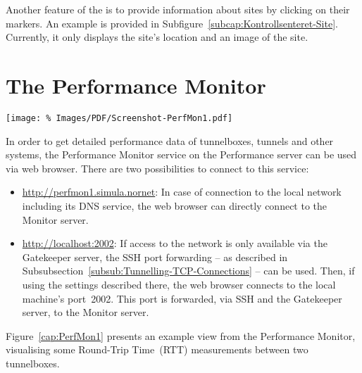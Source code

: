Another feature of the  is to provide information about sites by clicking on their markers. An example is provided in Subfigure~\ref{subcap:Kontrollsenteret-Site}. Currently, it only displays the site's location and an image of the site.



\section{The Performance Monitor}
\label{sec:PerfMon}

\begin{figure*}
\begin{center}
\texttt{[image: \%
   Images/PDF/Screenshot-PerfMon1.pdf]}
\end{center}
\caption{Performance Visualisation with the Performance Monitor}
\label{cap:PerfMon1}
\end{figure*}

In order to get detailed performance data of tunnelboxes, tunnels and other  systems, the Performance Monitor service on the Performance server can be used via web browser. There are two possibilities to connect to this service:
\begin{itemize}
 \item \url{http://perfmon1.simula.nornet}:
 In case of connection to the local  network including its DNS service, the web browser can directly connect to the Monitor server.
 
 \item \url{http://localhost:2002}:
 If access to the  network is only available via the Gatekeeper server, the SSH port forwarding -- as described in Subsubsection~\ref{subsub:Tunnelling-TCP-Connections} -- can be used. Then, if using the settings described there, the web browser connects to the local machine's port~2002. This port is forwarded, via SSH and the Gatekeeper server, to the Monitor server.
\end{itemize}

Figure~\ref{cap:PerfMon1} presents an example view from the Performance Monitor, visualising some Round-Trip Time~(RTT) measurements between two tunnelboxes.



